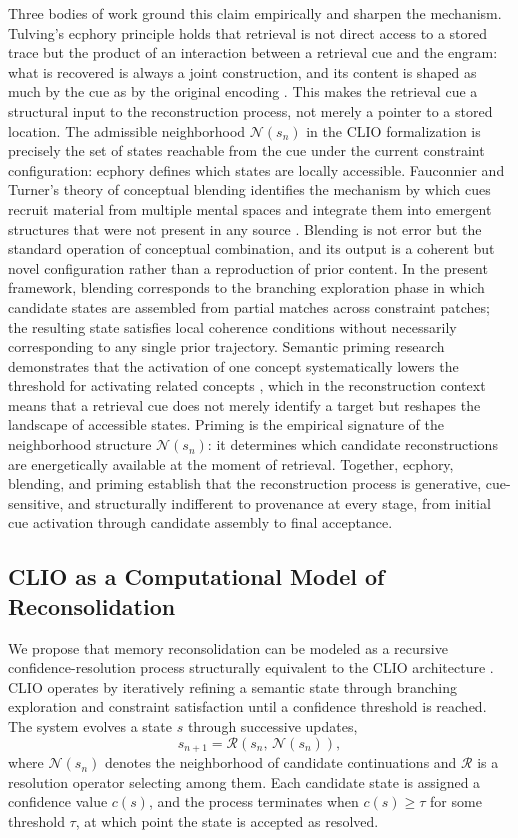 \documentclass[12pt, a4paper]{article}
\begin{document}
Three bodies of work ground this claim empirically and sharpen the mechanism. Tulving's ecphory principle holds that retrieval is not direct access to a stored trace but the product of an interaction between a retrieval cue and the engram: what is recovered is always a joint construction, and its content is shaped as much by the cue as by the original encoding \cite{tulving1983}. This makes the retrieval cue a structural input to the reconstruction process, not merely a pointer to a stored location. The admissible neighborhood $\mathcal{N}(s_n)$ in the CLIO formalization is precisely the set of states reachable from the cue under the current constraint configuration: ecphory defines which states are locally accessible. Fauconnier and Turner's theory of conceptual blending identifies the mechanism by which cues recruit material from multiple mental spaces and integrate them into emergent structures that were not present in any source \cite{fauconnier2002}. Blending is not error but the standard operation of conceptual combination, and its output is a coherent but novel configuration rather than a reproduction of prior content. In the present framework, blending corresponds to the branching exploration phase in which candidate states are assembled from partial matches across constraint patches; the resulting state satisfies local coherence conditions without necessarily corresponding to any single prior trajectory. Semantic priming research demonstrates that the activation of one concept systematically lowers the threshold for activating related concepts \cite{meyer1971}, which in the reconstruction context means that a retrieval cue does not merely identify a target but reshapes the landscape of accessible states. Priming is the empirical signature of the neighborhood structure $\mathcal{N}(s_n)$: it determines which candidate reconstructions are energetically available at the moment of retrieval. Together, ecphory, blending, and priming establish that the reconstruction process is generative, cue-sensitive, and structurally indifferent to provenance at every stage, from initial cue activation through candidate assembly to final acceptance.

\subsection{CLIO as a Computational Model of Reconsolidation}

We propose that memory reconsolidation can be modeled as a recursive confidence-resolution process structurally equivalent to the CLIO architecture \cite{cheng2025}. CLIO operates by iteratively refining a semantic state through branching exploration and constraint satisfaction until a confidence threshold is reached. The system evolves a state $s$ through successive updates,
\[
s_{n+1} = \mathcal{R}(s_n,\, \mathcal{N}(s_n)),
\]
where $\mathcal{N}(s_n)$ denotes the neighborhood of candidate continuations and $\mathcal{R}$ is a resolution operator selecting among them. Each candidate state is assigned a confidence value $c(s)$, and the process terminates when $c(s) \geq \tau$ for some threshold $\tau$, at which point the state is accepted as resolved.
\end{document}
